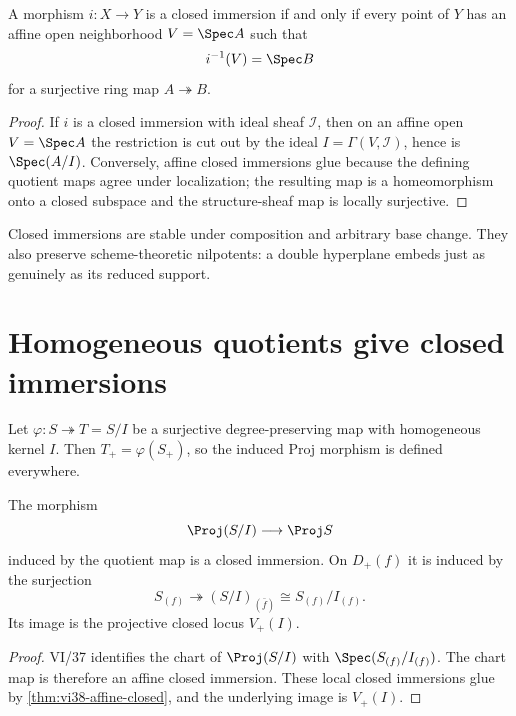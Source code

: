 \begin{theorem}\label{thm:vi38-affine-closed}
A morphism \(i:X\to Y\) is a closed immersion if and only if every point of \(Y\) has an affine open neighborhood \(V=\Spec A\) such that
\[
  i^{-1}(V)=\Spec B
\]
for a surjective ring map \(A\twoheadrightarrow B\).
\end{theorem}

\begin{proof}
If \(i\) is a closed immersion with ideal sheaf \(\mathcal I\), then on an affine open \(V=\Spec A\) the restriction is cut out by the ideal \(I=\Gamma(V,\mathcal I)\), hence is \(\Spec(A/I)\).  Conversely, affine closed immersions glue because the defining quotient maps agree under localization; the resulting map is a homeomorphism onto a closed subspace and the structure-sheaf map is locally surjective.
\end{proof}

Closed immersions are stable under composition and arbitrary base change.  They also preserve scheme-theoretic nilpotents: a double hyperplane embeds just as genuinely as its reduced support.

\section{Homogeneous quotients give closed immersions}
Let \(\varphi:S\twoheadrightarrow T=S/I\) be a surjective degree-preserving map with homogeneous kernel \(I\).  Then \(T_+=\varphi(S_+)\), so the induced Proj morphism is defined everywhere.

\begin{theorem}\label{thm:vi38-quotient-closed}
The morphism
\[
  \Proj(S/I)\longrightarrow\Proj S
\]
induced by the quotient map is a closed immersion.  On \(D_+(f)\) it is induced by the surjection
\[
  S_{(f)}\twoheadrightarrow (S/I)_{(\bar f)}
  \cong S_{(f)}/I_{(f)}.
\]
Its image is the projective closed locus \(V_+(I)\).
\end{theorem}

\begin{proof}
VI/37 identifies the chart of \(\Proj(S/I)\) with \(\Spec(S_{(f)}/I_{(f)})\).  The chart map is therefore an affine closed immersion.  These local closed immersions glue by \cref{thm:vi38-affine-closed}, and the underlying image is \(V_+(I)\).
\end{proof}



